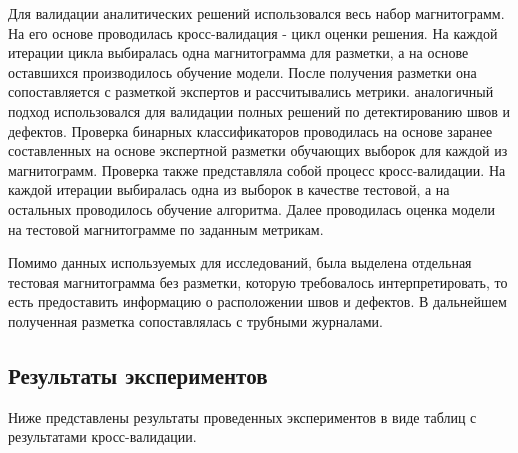 \documentclass[a4paper,article,14pt]{extarticle}
\begin{document}
Для валидации аналитических решений использовался весь набор магнитограмм. 
На его основе проводилась кросс-валидация - цикл оценки решения. На каждой 
итерации цикла выбиралась одна магнитограмма для разметки, а на основе оставшихся 
производилось обучение модели. После получения разметки она сопоставляется с разметкой 
экспертов и рассчитывались метрики. аналогичный подход использовался для валидации 
полных решений по детектированию швов и дефектов. Проверка бинарных классификаторов 
проводилась на основе заранее составленных  на основе экспертной разметки обучающих 
выборок для каждой из магнитограмм. Проверка также представляла собой процесс кросс-валидации. 
На каждой итерации выбиралась одна из выборок в качестве тестовой, а на остальных проводилось 
обучение алгоритма. Далее проводилась оценка модели на тестовой магнитограмме по заданным метрикам.

Помимо данных используемых для исследований, была выделена отдельная тестовая магнитограмма без 
разметки, которую требовалось интерпретировать, то есть предоставить информацию о расположении  
швов и дефектов. В дальнейшем полученная разметка сопоставлялась с трубными журналами.

\subsection{Результаты экспериментов}

Ниже представлены результаты проведенных экспериментов в виде таблиц с результатами кросс-валидации.
\end{document}
